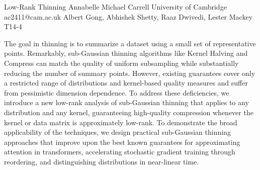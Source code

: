\begin{talk}
  {Low-Rank Thinning}%
  {Annabelle Michael Carrell}%
  {University of Cambridge}%
  {ac2411@cam.ac.uk}%
  {Albert Gong, Abhishek Shetty, Raaz Dwivedi, Lester Mackey}%
  {T14-4}%
			
The goal in thinning is to summarize a dataset using a small set of representative points. Remarkably, sub-Gaussian thinning algorithms like Kernel Halving and Compress can match the quality of uniform subsampling while substantially reducing the number of summary points. However, existing guarantees cover only a restricted range of distributions and kernel-based quality measures and suffer from pessimistic dimension dependence. To address these deficiencies, we introduce a new low-rank analysis of sub-Gaussian thinning that applies to any distribution and any kernel, guaranteeing high-quality compression whenever the kernel or data matrix is approximately low-rank. To demonstrate the broad applicability of the techniques, we design practical sub-Gaussian thinning approaches that improve upon the best known guarantees for approximating attention in transformers, accelerating stochastic gradient training through reordering, and distinguishing distributions in near-linear time. 

\medskip

\end{talk}

